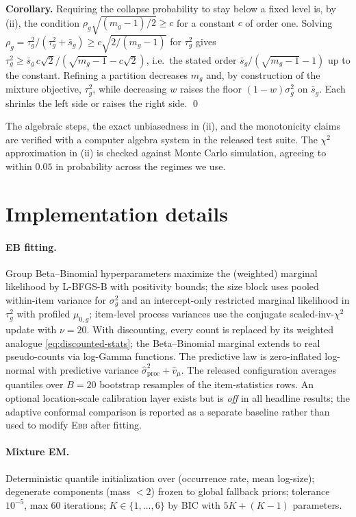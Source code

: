 \documentclass[twocolumn,10pt]{article}
\theoremstyle{definition}
\newcommand{\EBB}{\textsc{Ebb}}
\begin{document}
\textbf{Corollary.} Requiring the collapse probability to stay below a
fixed level is, by (ii), the condition $\rho_g\sqrt{(m_g-1)/2}\ge c$ for
a constant $c$ of order one. Solving
$\rho_g=\tau_g^2/(\tau_g^2+\bar s_g)\ge c\sqrt{2/(m_g-1)}$ for
$\tau_g^2$ gives
$\tau_g^2\ge\bar s_g\,c\sqrt{2}/(\sqrt{m_g-1}-c\sqrt2)$, i.e.\ the
stated order $\bar s_g/(\sqrt{m_g-1}-1)$ up to the constant. Refining a
partition decreases $m_g$ and, by construction of the mixture objective,
$\tau_g^2$, while decreasing $w$ raises the floor $(1-w)\sigma_g^2$ on
$\bar s_g$. Each shrinks the left side or raises the right side. \qed

The algebraic steps, the exact unbiasedness in (ii), and the monotonicity
claims are verified with a computer algebra system in
the released test suite. The $\chi^2$ approximation in (ii) is checked
against Monte Carlo simulation, agreeing to within $0.05$ in probability
across the regimes we use.

\section{Implementation details}\label{app:implementation}

\paragraph{EB fitting.} Group Beta--Binomial hyperparameters maximize the
(weighted) marginal likelihood by L-BFGS-B with positivity bounds; the
size block uses pooled within-item variance for $\sigma^2_g$ and an
intercept-only restricted marginal likelihood in $\tau^2_g$ with profiled
$\mu_{0,g}$; item-level process variances use the conjugate
scaled-inv-$\chi^2$ update with $\nu{=}20$. With discounting, every count
is replaced by its weighted analogue \eqref{eq:discounted-stats}; the
Beta--Binomial marginal extends to real pseudo-counts via log-Gamma
functions. The predictive law is zero-inflated log-normal with predictive
variance $\hat\sigma^2_{\mathrm{proc}}+\hat v_\mu$. The released
configuration averages quantiles over $B{=}20$ bootstrap resamples of the
item-statistics rows. An optional location-scale calibration layer exists
but is \emph{off} in all headline results; the adaptive conformal
comparison is reported as a separate baseline rather than used to modify
\EBB{} after fitting.

\paragraph{Mixture EM.} Deterministic quantile initialization over
(occurrence rate, mean log-size); degenerate components (mass $<2$)
frozen to global fallback priors; tolerance $10^{-5}$, max 60 iterations;
$K\in\{1,\dots,6\}$ by BIC with $5K+(K-1)$ parameters.
\end{document}

